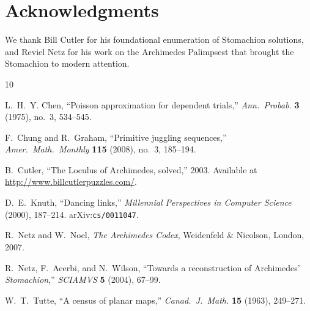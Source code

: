 \documentclass[12pt]{article}
\theoremstyle{definition}
\theoremstyle{remark}
\begin{document}
\section*{Acknowledgments}

We thank Bill Cutler for his foundational enumeration of Stomachion
solutions, and Reviel Netz for his work on the Archimedes Palimpsest
that brought the Stomachion to modern attention.

\begin{thebibliography}{10}

L.~H.~Y. Chen, ``Poisson approximation for dependent trials,''
\emph{Ann.\ Probab.} \textbf{3} (1975), no.~3, 534--545.

F.~Chung and R.~Graham,
``Primitive juggling sequences,''
\emph{Amer.\ Math.\ Monthly} \textbf{115} (2008), no.~3, 185--194.

B.~Cutler, ``The Loculus of Archimedes, solved,'' 2003.
Available at \url{http://www.billcutlerpuzzles.com/}.

D.~E.~Knuth, ``Dancing links,''
\emph{Millennial Perspectives in Computer Science} (2000), 187--214.
arXiv:\texttt{cs/0011047}.

R.~Netz and W.~Noel,
\emph{The Archimedes Codex},
Weidenfeld \& Nicolson, London, 2007.

R.~Netz, F.~Acerbi, and N.~Wilson,
``Towards a reconstruction of Archimedes' \emph{Stomachion},''
\emph{SCIAMVS} \textbf{5} (2004), 67--99.

W.~T.~Tutte,
``A census of planar maps,''
\emph{Canad.\ J.\ Math.} \textbf{15} (1963), 249--271.

\end{thebibliography}
\end{document}
